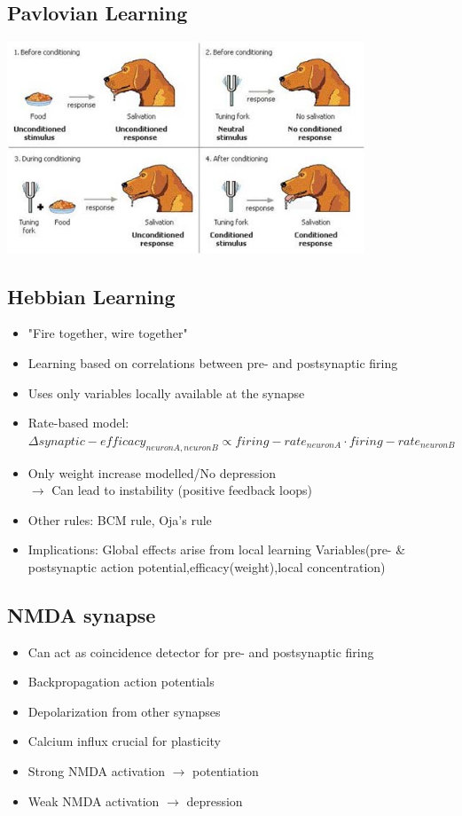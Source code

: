 \documentclass[english,11pt]{article}
\begin{document}
\subsection{Pavlovian Learning}

\includegraphics[width=0.8\textwidth]{pavlovian-conditioning.png}

\subsection{Hebbian Learning}
\begin{itemize}
\item "Fire together, wire together"
\item Learning based on correlations between pre- and postsynaptic firing
\item Uses only variables locally available at the synapse
\item Rate-based model: $\Delta synaptic-efficacy_{neuron A,neuron B} \propto firing-rate_{neuron A} \cdot firing-rate_{neuron B}$
\item Only weight increase modelled/No depression\\
$\rightarrow$ Can lead to instability (positive feedback loops)
\item Other rules: BCM rule, Oja's rule
\item Implications:
\subitem Global effects arise from local learning
\subitem Variables(pre- \& postsynaptic action potential,efficacy(weight),local concentration)
\end{itemize}

\subsection{NMDA synapse}
\begin{itemize}
\item Can act as coincidence detector for pre- and postsynaptic firing
\item Backpropagation action potentials
\item Depolarization from other synapses
\item Calcium influx crucial for plasticity
\item Strong NMDA activation $\rightarrow$ potentiation
\item Weak NMDA activation $\rightarrow$ depression
\end{itemize}
\end{document}
